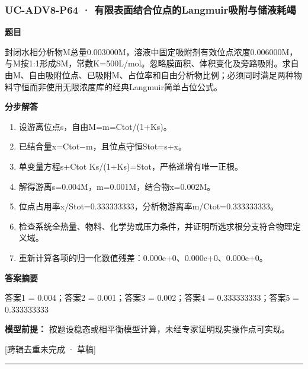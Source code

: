 \documentclass[UTF8,11pt,a4paper]{ctexart}
\begin{document}
\subsubsection*{UC-ADV8-P64 · 有限表面结合位点的Langmuir吸附与储液耗竭}
\noindent\textbf{题目}\par
封闭水相分析物M总量0.003000M，溶液中固定吸附剂有效位点浓度0.006000M，与M按1:1形成SM，常数K=500L/mol。忽略膜面积、体积变化及旁路吸附。求自由M、自由吸附位点、已吸附M、占位率和自由分析物比例；必须同时满足两种物料守恒而非使用无限浓度库的经典Langmuir简单占位公式。\par
\medskip\noindent\textbf{分步解答}
\begin{enumerate}
\item 设游离位点s，自由M=m=Ctot/(1+Ks)。
\item 已结合量x=Ctot−m，且位点守恒Stot=s+x。
\item 单变量方程s+Ctot Ks/(1+Ks)=Stot，严格递增有唯一正根。
\item 解得游离s=0.004M，m=0.001M，结合物x=0.002M。
\item 位点占用率x/Stot=0.333333333，分析物游离率m/Ctot=0.333333333。
\item 检查系统全热量、物料、化学势或压力条件，并证明所选求根分支符合物理定义域。
\item 重新计算各项的归一化数值残差：0.000e+0、0.000e+0、0.000e+0。
\end{enumerate}
\noindent\textbf{答案摘要}\par
答案1 = 0.004；答案2 = 0.001；答案3 = 0.002；答案4 = 0.333333333；答案5 = 0.333333333\par
\noindent\textbf{模型前提：}
按题设稳态或相平衡模型计算，未经专家证明现实操作点可实现。\par
\noindent\textcolor{red!65!black}{[跨辑去重未完成 · 草稿]} \par
\medskip\hrule\medskip
{}
\end{document}
